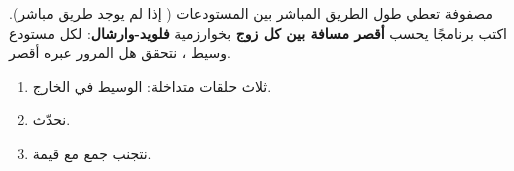\begin{statement}
مصفوفة  تعطي طول الطريق المباشر بين المستودعات ( إذا لم يوجد طريق مباشر). اكتب برنامجًا يحسب \textbf{أقصر مسافة بين كل زوج} بخوارزمية \textbf{فلويد-وارشال}: لكل مستودع وسيط ، نتحقق هل المرور عبره أقصر.
\end{statement}
\begin{stepsbox}\begin{enumerate}
\item ثلاث حلقات متداخلة: الوسيط  في الخارج.
\item \par{\centering\small{}\par} نحدّث.
\item نتجنب جمع  مع قيمة.
\end{enumerate}\end{stepsbox}
